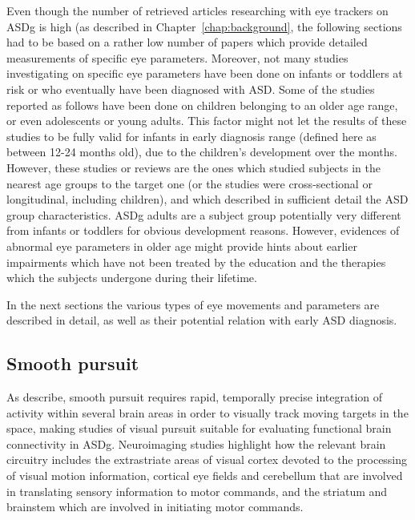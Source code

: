 Even though the number of retrieved articles researching with eye trackers on ASDg is high (as described in Chapter~\ref{chap:background}, the following sections had to be based on a rather low number of papers which provide detailed measurements of specific eye parameters. Moreover, not many studies investigating on specific eye parameters have been done on infants or toddlers at risk or who eventually have been diagnosed with ASD. Some of the studies reported as follows have been done on children belonging to an older age range, or even adolescents or young adults. This factor might not let the results of these studies to be fully valid for infants in early diagnosis range (defined here as between 12-24 months old), due to the children’s development over the months. However, these studies or reviews are the ones which studied subjects in the nearest age groups to the target one (or the studies were cross-sectional or longitudinal, including children), and which described in sufficient detail the ASD group characteristics. ASDg adults are a subject group potentially very different from infants or toddlers for obvious development reasons. However, evidences of abnormal eye parameters in older age might provide hints about earlier impairments which have not been treated by the education and the therapies which the subjects undergone during their lifetime.

In the next sections the various types of eye movements and parameters are described in detail, as well as their potential relation with early ASD diagnosis.



\subsection{Smooth pursuit}
\label{sec:smoothpursuittheory}

As \cite{takarae2004smoothpursuit} describe, smooth pursuit requires rapid, temporally precise integration of activity within several brain areas in order to visually track moving targets in the space, making studies of visual pursuit suitable for evaluating functional brain connectivity in ASDg. Neuroimaging studies highlight how the relevant brain circuitry includes the extrastriate areas of visual cortex devoted to the processing of visual motion information, cortical eye fields and cerebellum that are involved in translating sensory information to motor commands, and the striatum and brainstem which are involved in initiating motor commands.

